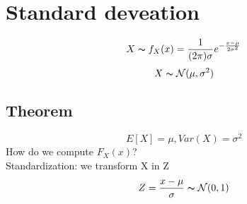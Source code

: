 \documentclass{article}
\newcommand{\N}{{\mathcal{N}}}
\begin{document}
\section{Standard deveation}
$$ X\thicksim f_X(x) = \frac{1}{(2\pi)\sigma}e^{ -\frac{x-\mu}{2\sigma^2} } $$
$$ X\thicksim \N(\mu, \sigma^2)$$

\subsection{Theorem}
$$ E[X] = \mu, Var(X) = \sigma^2 $$
How do we compute $F_X(x)$?\\
Standardization: we transform X in Z
$$ Z = \f{x-\mu}{\sigma} \thicksim \N(0,1) $$
\end{document}

